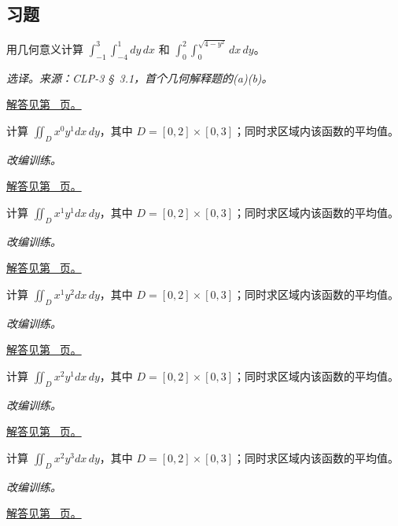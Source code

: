 \documentclass[UTF8,12pt,a4paper,fontset=fandol]{ctexart}
\begin{document}
\subsection{习题}
\begin{example}[不作累次积分的几何计算]\label{ex:c36q1}
用几何意义计算 $\int_{-1}^{3}\int_{-4}^{1}dy\,dx$ 和 $\int_0^2\int_0^{\sqrt{4-y^2}}dx\,dy$。
\par\textit{选译。来源：CLP-3 \S~3.1，首个几何解释题的(a)(b)。}\par\hyperref[ans:c36q1]{解答见第~\pageref{ans:c36q1} 页。}
\end{example}
\begin{example}[矩形区域上的乘积分离]\label{ex:c36q2}
计算 $\displaystyle\iint_Dx^{0}y^{1}dx\,dy$，其中 $D=[0,2]\times[0,3]$；同时求区域内该函数的平均值。
\par\textit{改编训练。}\par\hyperref[ans:c36q2]{解答见第~\pageref{ans:c36q2} 页。}
\end{example}
\begin{example}[矩形区域上的乘积分离]\label{ex:c36q3}
计算 $\displaystyle\iint_Dx^{1}y^{1}dx\,dy$，其中 $D=[0,2]\times[0,3]$；同时求区域内该函数的平均值。
\par\textit{改编训练。}\par\hyperref[ans:c36q3]{解答见第~\pageref{ans:c36q3} 页。}
\end{example}
\begin{example}[矩形区域上的乘积分离]\label{ex:c36q4}
计算 $\displaystyle\iint_Dx^{1}y^{2}dx\,dy$，其中 $D=[0,2]\times[0,3]$；同时求区域内该函数的平均值。
\par\textit{改编训练。}\par\hyperref[ans:c36q4]{解答见第~\pageref{ans:c36q4} 页。}
\end{example}
\begin{example}[矩形区域上的乘积分离]\label{ex:c36q5}
计算 $\displaystyle\iint_Dx^{2}y^{1}dx\,dy$，其中 $D=[0,2]\times[0,3]$；同时求区域内该函数的平均值。
\par\textit{改编训练。}\par\hyperref[ans:c36q5]{解答见第~\pageref{ans:c36q5} 页。}
\end{example}
\begin{example}[矩形区域上的乘积分离]\label{ex:c36q6}
计算 $\displaystyle\iint_Dx^{2}y^{3}dx\,dy$，其中 $D=[0,2]\times[0,3]$；同时求区域内该函数的平均值。
\par\textit{改编训练。}\par\hyperref[ans:c36q6]{解答见第~\pageref{ans:c36q6} 页。}
\end{example}
\end{document}
